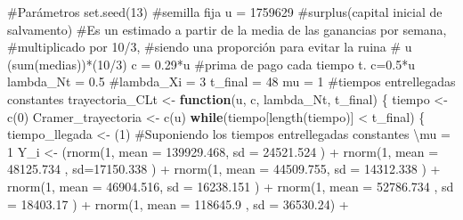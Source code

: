\documentclass[
  us-letterpaper,
]{scrreprt}
\newenvironment{Shaded}{\begin{snugshade}}{\end{snugshade}}
\newcommand{\AttributeTok}[1]{\textcolor[rgb]{0.40,0.45,0.13}{#1}}
\newcommand{\CommentTok}[1]{\textcolor[rgb]{0.37,0.37,0.37}{#1}}
\newcommand{\ControlFlowTok}[1]{\textcolor[rgb]{0.00,0.23,0.31}{\textbf{#1}}}
\newcommand{\DecValTok}[1]{\textcolor[rgb]{0.68,0.00,0.00}{#1}}
\newcommand{\FloatTok}[1]{\textcolor[rgb]{0.68,0.00,0.00}{#1}}
\newcommand{\FunctionTok}[1]{\textcolor[rgb]{0.28,0.35,0.67}{#1}}
\newcommand{\NormalTok}[1]{\textcolor[rgb]{0.00,0.23,0.31}{#1}}
\newcommand{\OtherTok}[1]{\textcolor[rgb]{0.00,0.23,0.31}{#1}}
\newcommand{\SpecialCharTok}[1]{\textcolor[rgb]{0.37,0.37,0.37}{#1}}
\theoremstyle{definition}
\theoremstyle{plain}
\theoremstyle{plain}
\theoremstyle{remark}
\begin{document}
\begin{Shaded}
\begin{Highlighting}[]
\CommentTok{\#Parámetros}
\FunctionTok{set.seed}\NormalTok{(}\DecValTok{13}\NormalTok{) }\CommentTok{\#semilla fija}
\NormalTok{u }\OtherTok{=} \DecValTok{1759629} \CommentTok{\#surplus(capital inicial de salvamento)}
\CommentTok{\#Es un estimado a partir de la media de las ganancias por semana, }
\CommentTok{\#multiplicado por 10/3, }
\CommentTok{\#siendo una proporción para evitar la ruina}
\CommentTok{\# u (sum(medias))*(10/3)}
\NormalTok{c }\OtherTok{=} \FloatTok{0.29}\SpecialCharTok{*}\NormalTok{u }\CommentTok{\#prima de pago cada tiempo t. c=0.5*u}
\NormalTok{lambda\_Nt }\OtherTok{=} \FloatTok{0.5}
\CommentTok{\#lambda\_Xi = 3}
\NormalTok{t\_final }\OtherTok{=} \DecValTok{48}
\NormalTok{mu }\OtherTok{=} \DecValTok{1} \CommentTok{\#tiempos entrellegadas constantes}
\NormalTok{trayectoria\_CLt }\OtherTok{\textless{}{-}} \ControlFlowTok{function}\NormalTok{(u, c, lambda\_Nt, t\_final)}
\NormalTok{\{}
\NormalTok{  tiempo }\OtherTok{\textless{}{-}} \FunctionTok{c}\NormalTok{(}\DecValTok{0}\NormalTok{)}
\NormalTok{  Cramer\_trayectoria }\OtherTok{\textless{}{-}} \FunctionTok{c}\NormalTok{(u)}
  \ControlFlowTok{while}\NormalTok{(tiempo[}\FunctionTok{length}\NormalTok{(tiempo)] }\SpecialCharTok{\textless{}}\NormalTok{ t\_final)}
\NormalTok{  \{}
\NormalTok{    tiempo\_llegada }\OtherTok{\textless{}{-}}\NormalTok{ (}\DecValTok{1}\NormalTok{) }
    \CommentTok{\#Suponiendo los tiempos entrellegadas constantes \textbackslash{}mu = 1}
\NormalTok{    Y\_i }\OtherTok{\textless{}{-}}\NormalTok{  (}\FunctionTok{rnorm}\NormalTok{(}\DecValTok{1}\NormalTok{, }\AttributeTok{mean =} \FloatTok{139929.468}\NormalTok{, }\AttributeTok{sd =} \FloatTok{24521.524}\NormalTok{ ) }\SpecialCharTok{+} 
             \FunctionTok{rnorm}\NormalTok{(}\DecValTok{1}\NormalTok{, }\AttributeTok{mean =} \FloatTok{48125.734}\NormalTok{ , }\AttributeTok{sd=}\FloatTok{17150.338}\NormalTok{ ) }\SpecialCharTok{+}  
             \FunctionTok{rnorm}\NormalTok{(}\DecValTok{1}\NormalTok{, }\AttributeTok{mean =}  \FloatTok{44509.755}\NormalTok{, }\AttributeTok{sd =} \FloatTok{14312.338}\NormalTok{ ) }\SpecialCharTok{+} 
             \FunctionTok{rnorm}\NormalTok{(}\DecValTok{1}\NormalTok{, }\AttributeTok{mean =}   \FloatTok{46904.516}\NormalTok{, }\AttributeTok{sd =} \FloatTok{16238.151}\NormalTok{ ) }\SpecialCharTok{+} 
             \FunctionTok{rnorm}\NormalTok{(}\DecValTok{1}\NormalTok{, }\AttributeTok{mean =} \FloatTok{52786.734}\NormalTok{  , }\AttributeTok{sd =} \FloatTok{18403.17}\NormalTok{ ) }\SpecialCharTok{+} 
             \FunctionTok{rnorm}\NormalTok{(}\DecValTok{1}\NormalTok{, }\AttributeTok{mean =} \FloatTok{118645.9}\NormalTok{  , }\AttributeTok{sd =} \FloatTok{36530.24}\NormalTok{) }\SpecialCharTok{+}

\end{Highlighting}
\end{Shaded}
\end{document}
